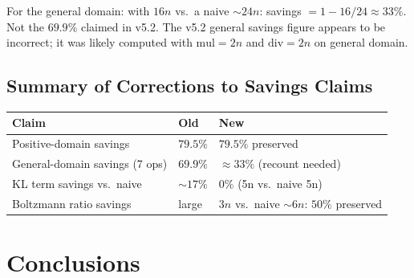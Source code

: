 \documentclass[11pt]{article}
\newcommand{\ok}[1]{\textcolor{ok}{#1}}
\newcommand{\flag}[1]{\textcolor{flag}{#1}}
\newcommand{\warn}[1]{\textcolor{warn}{#1}}
\begin{document}
For the general domain: with $16n$ vs.\ a naive $\sim 24n$:
savings $= 1 - 16/24 \approx 33\%$. Not the $69.9\%$ claimed in v5.2.
The v5.2 general savings figure appears to be incorrect; it was likely computed with
$\mathrm{mul} = 2n$ and $\mathrm{div} = 2n$ on general domain.

\subsection{Summary of Corrections to Savings Claims}

\begin{center}
\begin{tabular}{lll}
\toprule
Claim & Old & New \\
\midrule
Positive-domain savings & $79.5\%$ & $79.5\%$ \ok{preserved} \\
General-domain savings (7 ops) & $69.9\%$ & \flag{$\approx 33\%$} (recount needed) \\
KL term savings vs.\ naive & $\sim 17\%$ & \warn{$0\%$} (5n vs.\ naive 5n) \\
Boltzmann ratio savings & large & $3n$ vs.\ naive $\sim 6n$: $50\%$ \ok{preserved} \\
\bottomrule
\end{tabular}
\end{center}

\section{Conclusions}
\end{document}
